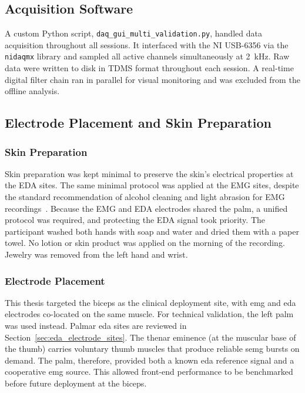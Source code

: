 \FloatBarrier


\subsection{Acquisition Software}
\label{sec:acquisition_software}
A custom Python script, \texttt{daq\_gui\_multi\_validation.py}, handled data acquisition throughout all sessions. It interfaced with the NI USB-6356 via the \texttt{nidaqmx} library and sampled all active channels simultaneously at \SI{2}{\kilo\hertz}. Raw data were written to disk in TDMS format throughout each session. A real-time digital filter chain ran in parallel for visual monitoring and was excluded from the offline analysis.

\subsection{Electrode Placement and Skin Preparation}

\subsubsection{Skin Preparation}

Skin preparation was kept minimal to preserve the skin's electrical properties at the EDA sites. The same minimal protocol was applied at the EMG sites, despite the standard recommendation of alcohol cleaning and light abrasion for EMG recordings~\cite{kamen_essentials_2010, konrad_abc_2006}. Because the EMG and EDA electrodes shared the palm, a unified protocol was required, and protecting the EDA signal took priority. The participant washed both hands with soap and water and dried them with a paper towel. No lotion or skin product was applied on the morning of the recording. Jewelry was removed from the left hand and wrist.

\subsubsection{Electrode Placement}
\label{sec:electrode_placement}
This thesis targeted the biceps as the clinical deployment site, with \gls{emg} and \gls{eda} electrodes co-located on the same muscle. For technical validation, the left palm was used instead. Palmar \gls{eda} sites are reviewed in Section~\ref{sec:eda_electrode_sites}. The thenar eminence (at the muscular base of the thumb) carries voluntary thumb muscles that produce reliable \gls{semg} bursts on demand. The palm, therefore, provided both a known \gls{eda} reference signal and a cooperative \gls{emg} source. This allowed front-end performance to be benchmarked before future deployment at the biceps.

